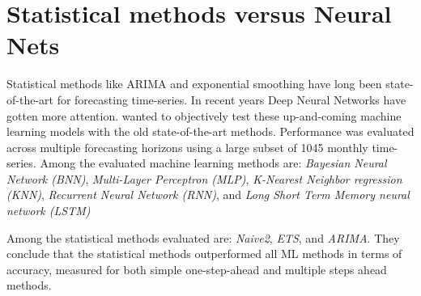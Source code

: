 \section{Statistical methods versus Neural Nets}
\label{section:RelatedWork:Statistical-NN}

Statistical methods like ARIMA and exponential smoothing have long been state-of-the-art for forecasting time-series.
In recent years Deep Neural Networks have gotten more attention.
\cite{Makridakis2018} wanted to objectively test these up-and-coming machine learning models with the old state-of-the-art methods.
Performance was evaluated across multiple forecasting horizons using a large subset of 1045 monthly time-series.
Among the evaluated machine learning methods are:
\textit{Bayesian Neural Network (BNN)},
\textit{Multi-Layer Perceptron (MLP)},
\textit{K-Nearest Neighbor regression (KNN)},
\textit{Recurrent Neural Network (RNN)}, and
\textit{Long Short Term Memory neural network (LSTM)}



Among the statistical methods evaluated are:
\textit{Naive2},
\textit{ETS}, and
\textit{ARIMA}.
They conclude that the statistical methods outperformed all ML methods in terms of accuracy, measured for both
simple one-step-ahead and multiple steps ahead methods.

